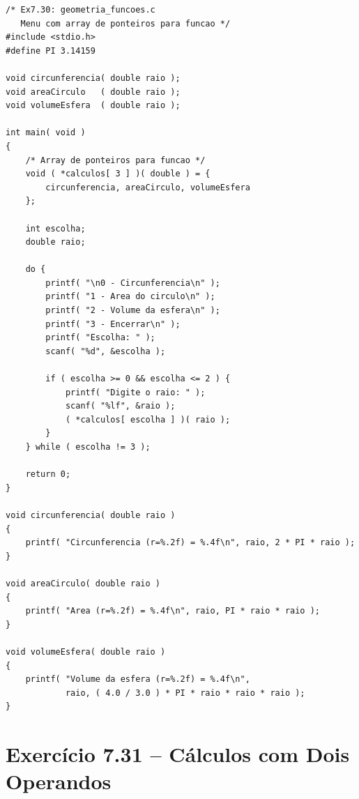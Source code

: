 \documentclass[12pt,a4paper]{article}
\begin{document}
\begin{respostabox}
\begin{lstlisting}
/* Ex7.30: geometria_funcoes.c
   Menu com array de ponteiros para funcao */
#include <stdio.h>
#define PI 3.14159

void circunferencia( double raio );
void areaCirculo   ( double raio );
void volumeEsfera  ( double raio );

int main( void )
{
    /* Array de ponteiros para funcao */
    void ( *calculos[ 3 ] )( double ) = {
        circunferencia, areaCirculo, volumeEsfera
    };

    int escolha;
    double raio;

    do {
        printf( "\n0 - Circunferencia\n" );
        printf( "1 - Area do circulo\n" );
        printf( "2 - Volume da esfera\n" );
        printf( "3 - Encerrar\n" );
        printf( "Escolha: " );
        scanf( "%d", &escolha );

        if ( escolha >= 0 && escolha <= 2 ) {
            printf( "Digite o raio: " );
            scanf( "%lf", &raio );
            ( *calculos[ escolha ] )( raio );
        }
    } while ( escolha != 3 );

    return 0;
}

void circunferencia( double raio )
{
    printf( "Circunferencia (r=%.2f) = %.4f\n", raio, 2 * PI * raio );
}

void areaCirculo( double raio )
{
    printf( "Area (r=%.2f) = %.4f\n", raio, PI * raio * raio );
}

void volumeEsfera( double raio )
{
    printf( "Volume da esfera (r=%.2f) = %.4f\n",
            raio, ( 4.0 / 3.0 ) * PI * raio * raio * raio );
}
\end{lstlisting}
\end{respostabox}

\section{Exercício 7.31 -- Cálculos com Dois Operandos}
\end{document}
